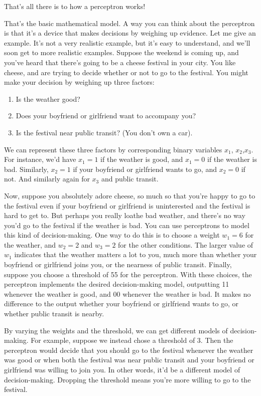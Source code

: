 \documentclass[a4paper,12pt]{report}%
\begin{document}
That's all there is to how a perceptron works!

That's the basic mathematical model. A way you can think about the perceptron is that it's a device that makes decisions by weighing up evidence. Let me give an example. It's not a very realistic example, but it's easy to understand, and we'll soon get to more realistic examples. Suppose the weekend is coming up, and you've heard that there's going to be a cheese festival in your city. You like cheese, and are trying to decide whether or not to go to the festival. You might make your decision by weighing up three factors:

\begin{enumerate}
 \item Is the weather good?
 \item Does your boyfriend or girlfriend want to accompany you?
 \item Is the festival near public transit? (You don't own a car).
\end{enumerate}

We can represent these three factors by corresponding binary variables $x_{1}$, $x_{2}$,$ x_{3}$. For instance, we'd have $x_{1} = 1$ if the weather is good, and $x_{1} = 0$ if the weather is bad. Similarly, $x_{2} = 1$ if your boyfriend or girlfriend wants to go, and $x_{2} = 0$ if not. And similarly again for $x_{3}$ and public transit.

Now, suppose you absolutely adore cheese, so much so that you're happy to go to the festival even if your boyfriend or girlfriend is uninterested and the festival is hard to get to. But perhaps you really loathe bad weather, and there's no way you'd go to the festival if the weather is bad. You can use perceptrons to model this kind of decision-making. One way to do this is to choose a weight $w_{1} = 6$ for the weather, and $w_{2} = 2$ and $w_{3} = 2$ for the other conditions. The larger value of $w_{1}$ indicates that the weather matters a lot to you, much more than whether your boyfriend or girlfriend joins you, or the nearness of public transit. Finally, suppose you choose a threshold of 55 for the perceptron. With these choices, the perceptron implements the desired decision-making model, outputting 11 whenever the weather is good, and 00 whenever the weather is bad. It makes no difference to the output whether your boyfriend or girlfriend wants to go, or whether public transit is nearby.


By varying the weights and the threshold, we can get different models of decision-making. For example, suppose we instead chose a threshold of $3$. Then the perceptron would decide that you should go to the festival whenever the weather was good or when both the festival was near public transit and your boyfriend or girlfriend was willing to join you. In other words, it'd be a different model of decision-making. Dropping the threshold means you're more willing to go to the festival.
\end{document}
